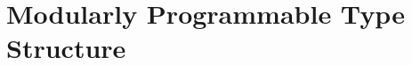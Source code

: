 \documentclass[12pt]{cmuthesis}
\newcommand{\todolater}[1]{{\color{magenta} TODO (Later): #1}}
\begin{document}
\part{Modularly Programmable Type Structure}\label{part:metamodules}







\backmatter

\renewcommand{\bibsection}{\chapter{\bibname}}
\renewcommand{\bibpreamble}{\todolater{List conference abbreviations.}\\
\todolater{Remove extraneous nonsense from entries.}}

\end{document}
